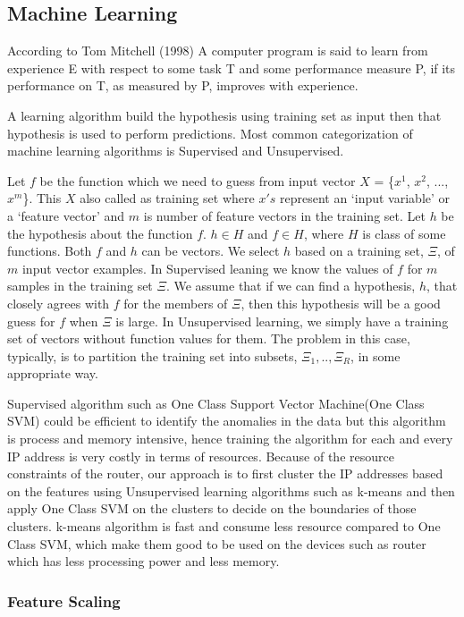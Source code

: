 \documentclass[10pt,oneside,a4paper]{article}
\begin{document}
\subsection{Machine Learning}

According to Tom Mitchell (1998) A computer program is said to learn from experience E with respect to some task T and some performance measure P, if its performance on T, as measured by P, improves with experience.

A learning algorithm build the hypothesis using training set as input then that hypothesis is used to perform predictions. Most common categorization of machine learning algorithms is Supervised and Unsupervised.

Let $f$ be the function which we need to guess from input vector $X$ = \{$x^{1}$, $x^{2}$, ..., $x^{m}$\}. This $X$ also called as training set where $x's$ represent an `input variable' or a `feature vector' and $m$ is number of feature vectors in the training set. Let $h$ be the hypothesis about the function $f$. $h \in H$ and $f \in H$, where $H$ is class of some functions. Both $f$ and $h$ can be vectors. We select $h$ based on a training set, $\Xi$, of $m$ input vector examples. In Supervised leaning we know the values of $f$ for $m$ samples in the training set
$\Xi$. We assume that if we can find a hypothesis, $h$, that closely agrees with $f$ for the members of $\Xi$, then this hypothesis will be a good guess for $f$ when $\Xi$ is large. In Unsupervised learning, we simply have a training set of vectors without function values for them. The problem in this case, typically, is to partition the training set into subsets, $\Xi_1,.. ,\Xi_R$, in some appropriate way.\cite{machine-learning}

Supervised algorithm such as One Class Support Vector Machine(One Class SVM)\cite{svm} could be efficient to identify the anomalies in the data but this algorithm is process and memory intensive, hence training the algorithm for each and every IP address is very costly in terms of resources. Because of the resource constraints of the router, our approach is to first cluster the IP addresses based on the features using Unsupervised learning algorithms such as k-means and then apply One Class SVM on the clusters to decide on the boundaries of those clusters. k-means algorithm is fast and consume less resource compared to One Class SVM, which make them good to be used on the devices such as router which has less processing power and less memory.

\subsubsection{Feature Scaling}
\end{document}
